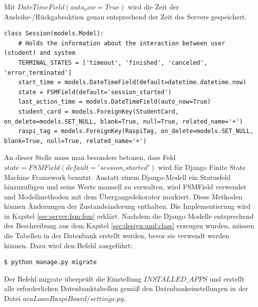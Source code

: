 Mit $DateTimeField(auto_now=True)$ wird die Zeit der Ausleihe-/Rückgabeaktion genau entsprechend der Zeit des Servers gespeichert. 
\begin{lstlisting}[caption={Session Modell},captionpos=b]
class Session(models.Model):
	# Holds the information about the interaction between user (student) and system
	TERMINAL_STATES = ['timeout', 'finished', 'canceled', 'error_terminated']
	start_time = models.DateTimeField(default=datetime.datetime.now)
	state = FSMField(default='session_started')
	last_action_time = models.DateTimeField(auto_now=True)
	student_card = models.ForeignKey(StudentCard, on_delete=models.SET_NULL, blank=True, null=True, related_name='+')
	raspi_tag = models.ForeignKey(RaspiTag, on_delete=models.SET_NULL, blank=True, null=True, related_name='+')
\end{lstlisting}
An dieser Stelle muss man besonders betonen, dass Feld $state = FSMField(default='session\_started')$ wird für Django Finite State Machine Framework benutzt. Anstatt einem Django-Modell ein Statusfeld hinzuzufügen und seine Werte manuell zu verwalten, wird FSMField verwendet und Modellmethoden mit dem Übergangsdekorator markiert\cite{website:fsm}. Diese Methoden können Änderungen der Zustandsänderung enthalten. Die Implementierung wird in Kapitel \ref{sec:server:fsm:fsm} erklärt. Nachdem die Django Modelle entsprechend der Beschreibung aus dem Kapitel \ref{sec:design:uml:class} erzeugen wurden, müssen die Tabellen in der Datenbank erstellt werden, bevor sie verwendt werden können. Dazu wird den  Befehl ausgeführt:
\begin{lstlisting}[caption={[Der Befehl migrate] },captionpos=b]
$ python manage.py migrate
\end{lstlisting}
Der Befehl migrate überprüft die Einstellung $INSTALLED\_APPS$ und erstellt alle erforderlichen Datenbanktabellen gemäß den Datenbankeinstellungen in der Datei $acaLoanRaspiBoard/settings.py$\cite{website:15}.

